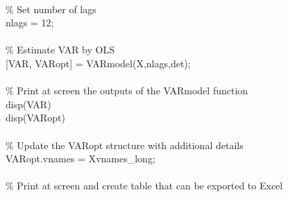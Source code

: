 \hspace{1mm}\hspace{5mm} \hspace{5mm}  \\ 
\hspace{1mm}\hspace{5mm} \hspace{5mm} \textcolor{matlabgreen}{\% Set number of lags }\\ 
\hspace{1mm}\hspace{5mm} \hspace{5mm} nlags = 12; \\ 
\hspace{1mm}\hspace{5mm} \hspace{5mm}  \\ 
\hspace{1mm}\hspace{5mm} \hspace{5mm} \textcolor{matlabgreen}{\% Estimate VAR by OLS }\\ 
\hspace{1mm}\hspace{5mm} \hspace{5mm} [VAR, VARopt] = VARmodel(X,nlags,det); \\ 
\hspace{1mm}\hspace{5mm} \hspace{5mm}  \\ 
\hspace{1mm}\hspace{5mm} \hspace{5mm} \textcolor{matlabgreen}{\% Print at screen the outputs of the VARmodel \textcolor{matlabblue}{function} }\\ 
\hspace{1mm}disp(VAR) \\ 
\hspace{1mm}disp(VARopt) \\ 
\hspace{1mm} \\ 
\hspace{1mm}\textcolor{matlabgreen}{\% Update the VARopt structure with additional details }\\ 
\hspace{1mm}VARopt.vnames = Xvnames\_long; \\ 
\hspace{1mm} \\ 
\hspace{1mm}\textcolor{matlabgreen}{\% Print at screen and create table that can be exported to Excel }\\ 
